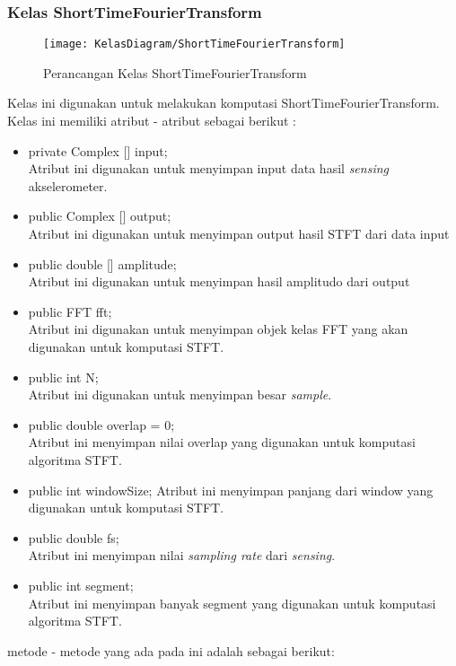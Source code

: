 \subsubsection{Kelas ShortTimeFourierTransform}
\begin{figure}[H]
	\centering
	\texttt{[image: KelasDiagram/ShortTimeFourierTransform]}  
	\caption[Perancangan Kelas ShortTimeFourierTransform]{Perancangan Kelas ShortTimeFourierTransform} 
	\label{fig:KelasShortTimeFourierTransform} 
\end{figure}

Kelas ini digunakan untuk melakukan komputasi ShortTimeFourierTransform. Kelas ini memiliki atribut - atribut sebagai berikut :
\begin{itemize}
	\item private Complex [] input; \\
		Atribut ini digunakan untuk menyimpan input data hasil {\it sensing} akselerometer.
	\item public Complex [] output; \\
		Atribut ini digunakan untuk menyimpan output hasil STFT dari data input
	\item public double [] amplitude; \\
		Atribut ini digunakan untuk menyimpan hasil amplitudo dari output	
	\item public FFT fft; \\
		Atribut ini digunakan untuk menyimpan objek kelas FFT yang akan digunakan untuk komputasi STFT.
	\item public int N; \\
		Atribut ini digunakan untuk menyimpan besar {\it sample}.
	\item public double overlap = 0; \\
		Atribut ini menyimpan nilai overlap yang digunakan untuk komputasi algoritma STFT.
	\item public int windowSize;
		Atribut ini menyimpan panjang dari window yang digunakan untuk komputasi STFT.
	\item public double fs;  \\
		Atribut ini menyimpan nilai {\it sampling rate} dari {\it sensing}.
	\item public int segment; \\
		Atribut ini menyimpan banyak segment yang digunakan untuk komputasi algoritma STFT.
\end{itemize}
metode - metode yang ada pada ini adalah sebagai berikut:
